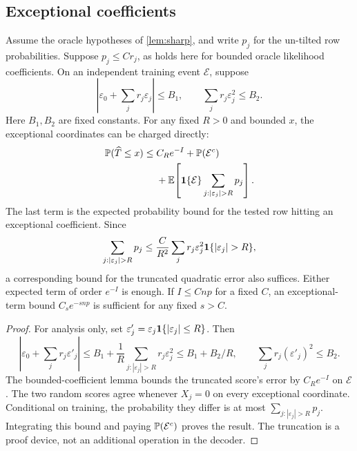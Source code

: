 \subsection{Exceptional coefficients}

\begin{lemma}
\label{lem:sparse-truncated-transfer}
Assume the oracle hypotheses of \cref{lem:sharp}, and write $p_j$
for the un-tilted row probabilities. Suppose $p_j\le Cr_j$, as
holds here for bounded oracle likelihood coefficients. On an independent
training event $\mathcal E$, suppose
\[
 \left|\varepsilon_0+\sum_jr_j\varepsilon_j\right|\le B_1,\qquad \sum_jr_j\varepsilon_j^2\le B_2.
\]
Here $B_1,B_2$ are fixed constants. For any fixed $R>0$ and bounded
$x$, the exceptional coordinates can be charged directly:
\begin{equation}\label{eq:sparse-truncated-transfer}
 \begin{split}
 \PP(\widehat T\le x)
 \le{}& C_Re^{-I}+\PP(\mathcal E^c)\\
 &+\E\!\left[\ind{\mathcal E}
             \sum_{j:|\varepsilon_j|>R}p_j\right].
 \end{split}
\end{equation}
The last term is the expected probability bound for the tested row
hitting an exceptional coefficient. Since
\[
 \sum_{j:|\varepsilon_j|>R}p_j
 \le\frac{C}{R^2}
      \sum_jr_j\varepsilon_j^2\ind{|\varepsilon_j|>R},
\]
a corresponding bound for the truncated quadratic error also suffices.
Either expected term of order $e^{-I}$ is enough.
If $I\le Cnp$ for a fixed $C$, an exceptional-term bound
$C_se^{-snp}$ is sufficient for any fixed $s>C$.
\end{lemma}

\begin{proof}
For analysis only, set
$\varepsilon'_j=\varepsilon_j\mathbf1\{|\varepsilon_j|\le R\}$.
Then
\[
 \left|\varepsilon_0+\sum_jr_j\varepsilon'_j\right|
 \le B_1+\frac1R\sum_{j:|\varepsilon_j|>R}r_j\varepsilon_j^2
 \le B_1+B_2/R,\qquad
 \sum_jr_j(\varepsilon'_j)^2\le B_2.
\]
The bounded-coefficient lemma bounds the truncated score's error by
$C_Re^{-I}$ on $\mathcal E$.
The two random scores agree whenever $X_j=0$ on every exceptional
coordinate. Conditional on training, the probability they differ is
at most $\sum_{j:|\varepsilon_j|>R}p_j$. Integrating this bound and
paying $\mathbb P(\mathcal E^c)$ proves the result. The truncation is a
proof device, not an additional operation in the decoder.
\end{proof}

